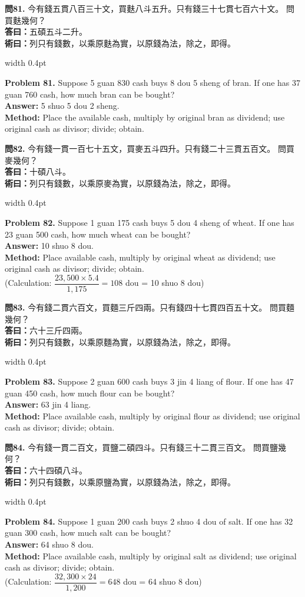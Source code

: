 \documentclass[10pt,a4paper]{article}
\newlength{\cnwidth}
\newlength{\enwidth}
\newcommand{\bilingual}[2]{%
  \noindent%
  \begin{minipage}[t]{\cnwidth}%
    #1%
  \end{minipage}%
  \hfill\vrule width 0.4pt\hfill%
  \begin{minipage}[t]{\enwidth}%
    #2%
  \end{minipage}%
  \par\smallskip%
}
\begin{document}
\bilingual{%
  \textbf{問81.}
  今有錢五貫八百三十文，買麩八斗五升。只有錢三十七貫七百六十文。
  問買麩幾何？\\
  \textbf{答曰：}五碩五斗二升。\\
  \textbf{術曰：}列只有錢數，以乘原麩為實，以原錢為法，除之，即得。
}{%
  \textbf{Problem 81.}
  Suppose 5 guan 830 cash buys 8 dou 5 sheng of bran.
  If one has 37 guan 760 cash, how much bran can be bought?\\
  \textbf{Answer:} 5 shuo 5 dou 2 sheng.\\
  \textbf{Method:} Place the available cash, multiply by original bran as dividend;
  use original cash as divisor; divide; obtain.
}

\bilingual{%
  \textbf{問82.}
  今有錢一貫一百七十五文，買麥五斗四升。只有錢二十三貫五百文。
  問買麥幾何？\\
  \textbf{答曰：}十碩八斗。\\
  \textbf{術曰：}列只有錢數，以乘原麥為實，以原錢為法，除之，即得。
}{%
  \textbf{Problem 82.}
  Suppose 1 guan 175 cash buys 5 dou 4 sheng of wheat.
  If one has 23 guan 500 cash, how much wheat can be bought?\\
  \textbf{Answer:} 10 shuo 8 dou.\\
  \textbf{Method:} Place available cash, multiply by original wheat as dividend;
  use original cash as divisor; divide; obtain.\\
  (Calculation: $\dfrac{23{,}500 \times 5.4}{1{,}175} = 108$ dou = 10 shuo 8 dou)
}

\bilingual{%
  \textbf{問83.}
  今有錢二貫六百文，買麵三斤四兩。只有錢四十七貫四百五十文。
  問買麵幾何？\\
  \textbf{答曰：}六十三斤四兩。\\
  \textbf{術曰：}列只有錢數，以乘原麵為實，以原錢為法，除之，即得。
}{%
  \textbf{Problem 83.}
  Suppose 2 guan 600 cash buys 3 jin 4 liang of flour.
  If one has 47 guan 450 cash, how much flour can be bought?\\
  \textbf{Answer:} 63 jin 4 liang.\\
  \textbf{Method:} Place available cash, multiply by original flour as dividend;
  use original cash as divisor; divide; obtain.
}

\bilingual{%
  \textbf{問84.}
  今有錢一貫二百文，買鹽二碩四斗。只有錢三十二貫三百文。
  問買鹽幾何？\\
  \textbf{答曰：}六十四碩八斗。\\
  \textbf{術曰：}列只有錢數，以乘原鹽為實，以原錢為法，除之，即得。
}{%
  \textbf{Problem 84.}
  Suppose 1 guan 200 cash buys 2 shuo 4 dou of salt.
  If one has 32 guan 300 cash, how much salt can be bought?\\
  \textbf{Answer:} 64 shuo 8 dou.\\
  \textbf{Method:} Place available cash, multiply by original salt as dividend;
  use original cash as divisor; divide; obtain.\\
  (Calculation: $\dfrac{32{,}300 \times 24}{1{,}200} = 648$ dou = 64 shuo 8 dou)
}
\end{document}
